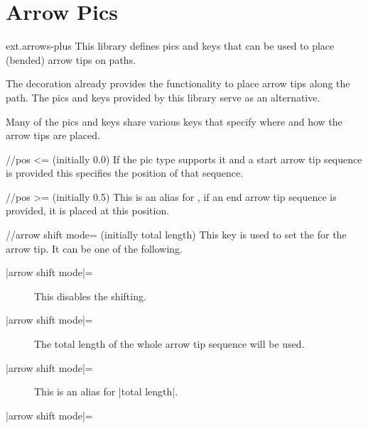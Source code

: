 %
%
%

\section{Arrow Pics}
\label{tikzlibrary:arrows}
\tikzset{external/export/.try=false}%
\begin{tikzlibrary}{ext.arrows-plus}
  This library defines pics and keys
  that can be used to place (bended) arrow tips on paths.
\end{tikzlibrary}

\begin{multicols}{2}
The  decoration
already provides the functionality to place arrow tips along the path.
The pics and keys provided by this library serve as an alternative.

Many of the pics and keys share various keys that specify
where and how the arrow tips are placed.
\begin{key}{/\tikzext/pos <= (initially 0.0)}
If the pic type supports it and a start arrow tip sequence is provided
this specifies the position of that sequence.
\end{key}
\begin{key}{/\tikzext/pos >= (initially 0.5)}
This is an alias for ,
if an end arrow tip sequence is provided, it is placed at this position.
\end{key}

\begin{key}{/\tikzext/arrow shift mode= (initially total length)}
This key is used to set the  for the arrow tip.
It can be one of the following.
\begin{description}
\item[|arrow shift mode|=]

  This disables the shifting.
\item[|arrow shift mode|=]

  The total length of the whole arrow tip sequence will be used.
\item[|arrow shift mode|=]

  This is an alias for |total length|.
\item[|arrow shift mode|=]


\end{description}
\end{key}
\end{multicols}
